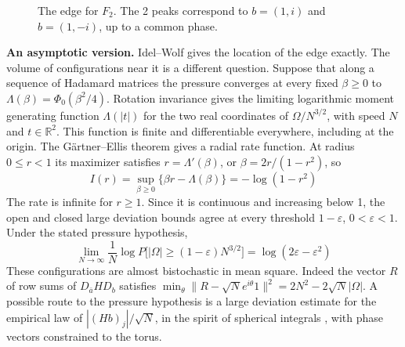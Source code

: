 \documentclass[11pt,a4paper]{article}
\theoremstyle{remark}
\begin{document}
\begin{figure}[H]
\centering
{}
\caption{The edge for $F_2$. The 2 peaks correspond to $b=(1,i)$ and
$b=(1,-i)$, up to a common phase.}\label{fig:edge}
\end{figure}

\medskip

\noindent\textbf{An asymptotic version.} Idel--Wolf gives the location of the edge exactly. The volume of configurations near it is a different question. Suppose that along a sequence of Hadamard matrices the pressure converges at every fixed $\beta\ge0$ to $\Lambda(\beta)=\Phi_0(\beta^2/4)$. Rotation invariance gives the limiting logarithmic moment generating function $\Lambda(|t|)$ for the two real coordinates of $\Omega/N^{3/2}$, with speed $N$ and $t\in\mathbb R^2$. This function is finite and differentiable everywhere, including at the origin. The G\"artner--Ellis theorem \cite{dez} gives a radial rate function. At radius $0\le r<1$ its maximizer satisfies $r=\Lambda'(\beta)$, or $\beta=2r/(1-r^2)$, so
\[
 I(r)=\sup_{\beta\ge0}\{\beta r-\Lambda(\beta)\}=-\log(1-r^2)
\]
The rate is infinite for $r\ge1$. Since it is continuous and increasing below 1, the open and closed large deviation bounds agree at every threshold $1-\varepsilon$, $0<\varepsilon<1$. Under the stated pressure hypothesis,
\[
 \lim_{N\to\infty}\frac1N\log P\big[|\Omega|\ge(1-\varepsilon)N^{3/2}\big]
       =\log(2\varepsilon-\varepsilon^2)
\]
These configurations are almost bistochastic in mean square. Indeed the vector $R$ of row sums of $D_{\bar a}HD_b$ satisfies $\min_\theta\|R-\sqrt N e^{i\theta}1\|^2=2N^2-2\sqrt N|\Omega|$. A possible route to the pressure hypothesis is a large deviation estimate for the empirical law of $|(Hb)_j|/\sqrt N$, in the spirit of spherical integrals \cite{gma}, with phase vectors constrained to the torus.
\end{document}
